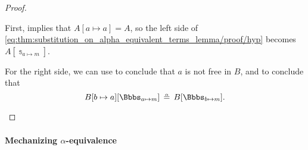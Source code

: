 \begin{proof}
\begin{itemize}
    First,  implies that \( A[a \mapsto a] = A \), so the left side of \eqref{eq:thm:substitution_on_alpha_equivalent_terms_lemma/proof/hyp} becomes \( A[\Bbbs_{a \mapsto m}] \).

    For the right side, we can use  to conclude that \( a \) is not free in \( B \), and  to conclude that
    \begin{equation*}
      B[b \mapsto a][\Bbbs_{a \mapsto m}] \aequiv B[\Bbbs_{b \mapsto m}].
    \end{equation*}
  \end{itemize}
\end{proof}

\paragraph{Mechanizing \( \alpha \)-equivalence}

